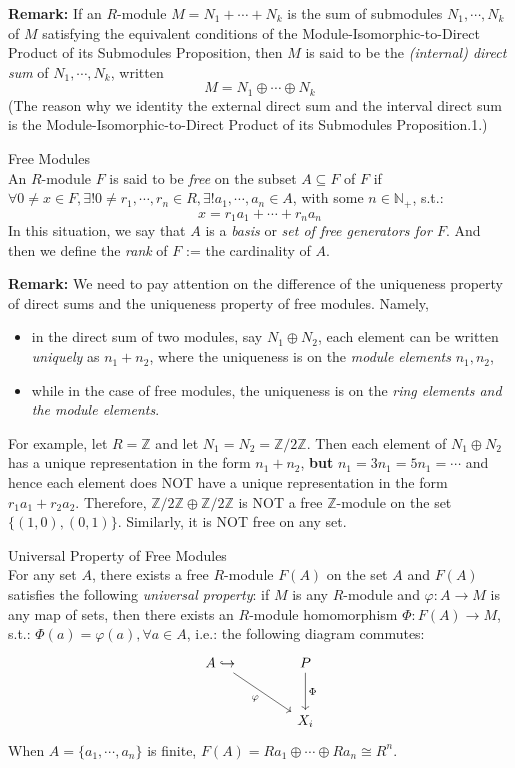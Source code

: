 \noindent\textbf{Remark:} If an $R$-module $M= N_1 +\cdots+ N_k$ is the sum of submodules $N_1,\cdots,N_k$ of $M$ satisfying the equivalent conditions of the Module-Isomorphic-to-Direct Product of its Submodules Proposition, then $M$ is said to be the \textit{(internal) direct sum} of $N_1 ,\cdots, N_k$, written
$$M=N_1 \oplus \cdots \oplus N_k$$
(The reason why we identity the external direct sum and the interval direct sum is the Module-Isomorphic-to-Direct Product of its Submodules Proposition.1.)

\begin{definition}{Free Modules}\\
An $R$-module $F$ is said to be \textit{free} on the subset $A \subseteq F$ of $F$ if $\forall 0\neq x\in F, \exists! 0\neq r_1 ,\cdots,r_n \in R, \exists! a_1 ,\cdots, a_n \in A$, with some $n\in \mathbb{N}_+$, s.t.:
$$x=r_1a_1 +\cdots +r_na_n$$
In this situation, we say that $A$ is a \textit{basis} or \textit{set of free generators for $F$}. And then we define the \textit{rank} of $F$ := the cardinality of $A$.
\end{definition}

\noindent\textbf{Remark:} We need to pay attention on the difference of the uniqueness property of direct sums and the uniqueness property of free modules. Namely,
\begin{itemize}
    \item in the direct sum of two modules, say $N_1 \oplus N_2$, each element can be written \textit{uniquely} as $n_1+n_2$, where the uniqueness is on the \textit{module elements} $n_1,n_2$,
    \item while in the case of free modules, the uniqueness is on the \textit{ring elements and the module elements}.
\end{itemize}
For example, let $R=\mathbb{Z}$ and let $N_1=N_2= \mathbb{Z}/2\mathbb{Z}$. Then each element of $N_1 \oplus N_2$ has a unique representation in the form $n_1+n_2$, \textbf{but} $n_1 =3n_1 = 5n_1= \cdots$ and hence each element does NOT have a unique representation in the form $r_1a_1 + r_2a_2$. Therefore, $\mathbb{Z}/2\mathbb{Z}\oplus \mathbb{Z}/2\mathbb{Z}$ is NOT a free $\mathbb{Z}$-module on the set $\{(1,0),(0,1)\}$. Similarly, it is NOT free on any set.

\begin{theorem}{Universal Property of Free Modules}\\
For any set $A$, there exists a free $R$-module $F(A)$ on the set $A$ and $F(A)$ satisfies the following \textit{universal property}: if $M$ is any $R$-module and $\varphi:A \to M$ is any map of sets, then there exists an $R$-module homomorphism $\Phi:F(A) \to M$, s.t.: $\Phi(a) =\varphi(a) ,\forall a\in A$, i.e.: the following diagram commutes:
$$\begin{tikzcd}[row sep=large, column sep=large]
    A \hookrightarrow \arrow[dr, "\varphi"'] & P \arrow[d, "\Phi"] \\
    & X_i
\end{tikzcd}$$
When $A=\{a_1 ,\cdots, a_n\}$ is finite, $F(A)= Ra_1 \oplus \cdots \oplus Ra_n \cong R^n$.
\end{theorem}

